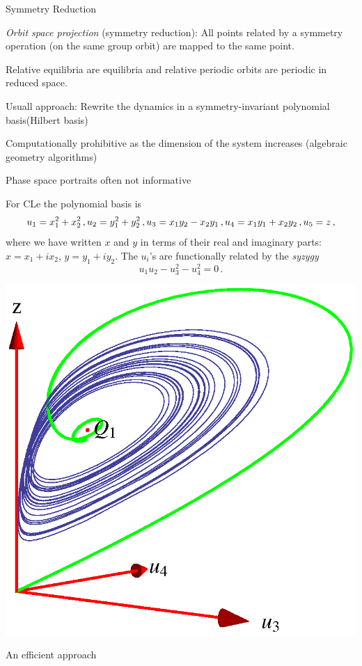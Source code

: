 \documentclass{theo1poster}[2003/04/25]
\renewcommand{\labelitemi}{\ding{228}}
\renewenvironment{itemize}%
 {\begin{list}{\labelitemi}%
       {%
        \setlength{\leftmargin}{0pt}%
        \setlength{\itemindent}{0pt}%
        \settowidth{\labelwidth}{\labelitemi}%
        \addtolength{\labelsep}{\itemindent}
        \addtolength{\leftmargin}{\labelwidth}%
        \addtolength{\leftmargin}{\labelsep}%
        \addtolength{\leftmargin}{-\itemindent}%
       }%
 }
 {\end{list}}
\begin{document}
\begin{poster}{3}
\begin{sheet}{Symmetry Reduction}
\large
\begin{itemize}
 \item  \emph{Orbit space projection} (symmetry reduction): All points related by a symmetry
	operation (on the same group orbit) are mapped to the same point.
 \item Relative equilibria are equilibria and relative periodic orbits are periodic in reduced space. 
 \item Usuall approach: Rewrite the dynamics in a symmetry-invariant polynomial basis(Hilbert basis)
	\begin{itemize}
 		\item Computationally prohibitive as the dimension of the system increases (algebraic geometry algorithms)
		\item Phase space portraits often not informative
		\item For CLe the polynomial basis is
		\[
			u_1 = x_1^2+x_2^2 \,, \\
			u_2 = y_1^2+y_2^2 \,, \\
			u_3 = x_1 y_2-x_2 y_1\,, \\
			u_4 = x_1 y_1+x_2 y_2\,, \\
			u_5 = z\,,
		\]
	where we have written $x$ and $y$ in terms of their real and imaginary parts: $x=x_1+i x_2$, $y=y_1+i y_2$. The $u_i$'s are functionally related by the \emph{syzygy}
	\[
 		u_1 u_2 -u_3^2-u_4^2 =0\,.
	\]
	\end{itemize}
\end{itemize}

	\includegraphics[width=.38\textwidth]{../../figs/CLEip1.eps}


\end{sheet}


\begin{sheet}{An efficient approach}


\end{sheet}
\end{poster}
\end{document}
